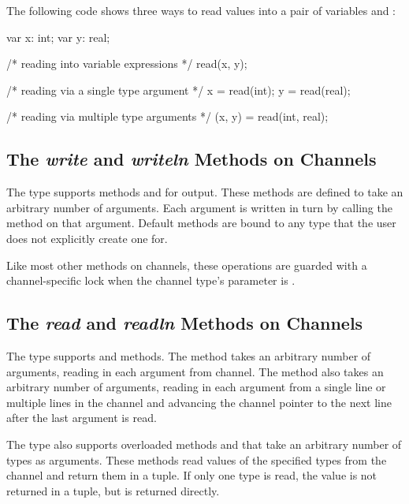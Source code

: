 \begin{example}
The following code shows three ways to read values into a pair of
variables  and :
\begin{chapel}
var x: int;
var y: real;

/* reading into variable expressions */
read(x, y);

/* reading via a single type argument */
x = read(int);
y = read(real);

/* reading via multiple type arguments */
(x, y) = read(int, real);
\end{chapel}
\end{example}


\subsection{The {\em write} and {\em writeln} Methods on Channels}
\label{IO_channel_write}

The  type supports methods  and 
for output.  These methods are defined to take an arbitrary number of
arguments.  Each argument is written in turn by calling
the  method on that argument.
Default  methods are bound to any type that the user
does not explicitly create one for.

Like most other methods on channels,
these operations are guarded with a channel-specific lock
when the channel type's  parameter is .


\subsection{The {\em read} and {\em readln} Methods on Channels}
\label{IO_channel_read}

The  type supports  and  methods.
The  method takes an arbitrary number of arguments, reading
in each argument from channel.  The  method also
takes an arbitrary number of arguments, reading in each argument
from a single line or multiple lines in the channel and 
advancing the channel pointer to the next line after the last argument 
is read.

The  type also supports overloaded methods 
and  that take an arbitrary number of types as arguments.
These methods read values of the specified types from the channel and
return them in a tuple.  If only one type is read, the value is not
returned in a tuple, but is returned directly.

